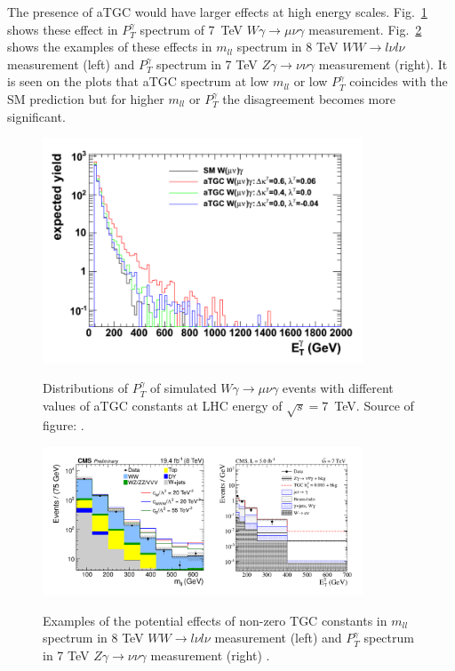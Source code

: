 The presence of aTGC would have larger effects at high energy scales. Fig.~\ref{fig:aTGC_Pt_Wg} shows these effect in $P_T^\gamma$ spectrum of 7~TeV $W\gamma \rightarrow \mu\nu\gamma$ measurement. Fig.~\ref{fig:aTGC_Pt_Examples}  shows the examples of these effects in $m_{ll}$ spectrum in 8 TeV $WW \rightarrow l\nu l\nu$ measurement (left) and $P_T^{\gamma}$ spectrum in 7 TeV $Z\gamma \rightarrow \nu\nu\gamma$ measurement (right). It is seen on the plots that aTGC spectrum at low $m_{ll}$ or low $P_T^{\gamma}$ coincides with the SM prediction but for higher $m_{ll}$ or $P_T^{\gamma}$ the disagreement becomes more significant.\\

\begin{figure}[htb]
  \begin{center}
    {\includegraphics[width=0.85\textwidth]{../figs/WgAbout/aTGC_Pt_Wg.png}}
    \caption{Distributions of $P_T^\gamma$ of simulated $W\gamma\rightarrow\mu\nu\gamma$ events with different values of aTGC constants at LHC energy of $\sqrt{s}=7$~TeV. Source of figure:  \cite{ref_Senka_thesis}.}
    \label{fig:aTGC_Pt_Wg}
  \end{center}
\end{figure}

\begin{figure}[htb]
  \begin{center}
    {\includegraphics[width=0.85\textwidth]{../figs/WgAbout/aTGC_Pt_Examples.png}}
    \caption{Examples of the potential effects of non-zero TGC constants in $m_{ll}$ spectrum in 8 TeV $WW \rightarrow l\nu l\nu$ measurement (left) \cite{ref_CMS_8TeV_WW} and $P_T^{\gamma}$ spectrum in 7 TeV $Z\gamma \rightarrow \nu\nu\gamma$ measurement (right) \cite{ref_CMS_7TeV_Zgnunug}.}
    \label{fig:aTGC_Pt_Examples}
  \end{center}
\end{figure}



